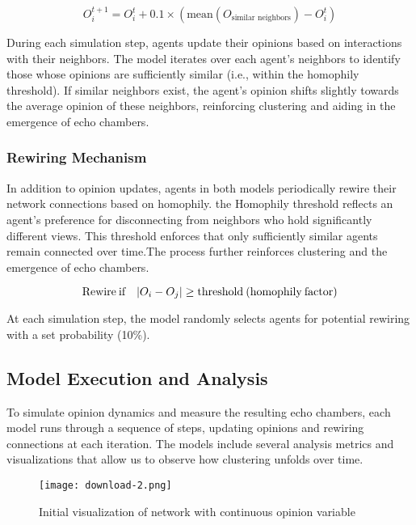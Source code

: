\documentclass{article} %
\begin{document}
\begin{equation}
 O_{i}^{t+1} = O_{i}^{t} + 0.1 \times (\text{mean}(O_{\text{similar neighbors}}) - O_{i}^{t})
\end{equation}

During each simulation step, agents update their opinions based on interactions with their neighbors. The model iterates over each agent’s neighbors to identify those whose opinions are sufficiently similar (i.e., within the homophily threshold). If similar neighbors exist, the agent’s opinion shifts slightly towards the average opinion of these neighbors, reinforcing clustering and aiding in the emergence of echo chambers.

\subsubsection{Rewiring Mechanism}
In addition to opinion updates, agents in both models periodically rewire their network connections based on homophily. 
the Homophily threshold reflects an agent’s preference for disconnecting from neighbors who hold significantly different views. This threshold enforces that only sufficiently similar agents remain connected over time.The process further reinforces clustering and the emergence of echo chambers.

\begin{equation}
\text{Rewire\:if}\quad |O_i - O_j| \geq \text{threshold\:(homophily\:factor)}
\end{equation}

At each simulation step, the model randomly selects agents for potential rewiring with a set probability (10\%). 

\subsection{Model Execution and Analysis}
To simulate opinion dynamics and measure the resulting echo chambers, each model runs through a sequence of steps, updating opinions and rewiring connections at each iteration. The models include several analysis metrics and visualizations that allow us to observe how clustering unfolds over time.

\begin{figure}[h]
    \centering
    \texttt{[image: download-2.png]}
    \caption{Initial visualization of network with continuous opinion variable}
    \label{fig:c1}
\end{figure}
\end{document}
